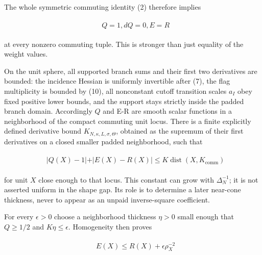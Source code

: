 The whole symmetric commuting identity (2) therefore implies

\begin{gather*}
\begin{aligned}
& Q=1, dQ=0, E=R
\end{aligned}\tag{15}
\end{gather*}

at every nonzero commuting tuple. This is stronger than just equality of
the weight values.

On the unit sphere, all supported branch sums and their first two
derivatives are bounded: the incidence Hessian is uniformly invertible
after (7), the flag multiplicity is bounded by (10), all nonconstant
cutoff transition scales \(a_{I}\) obey fixed positive lower bounds, and
the support stays strictly inside the padded branch domain. Accordingly
\(Q\) and E-R are smooth scalar functions in a neighborhood of the
compact commuting unit locus. There is a finite explicitly defined
derivative bound \(K_{N,\kappa ,L,\sigma ,\Theta}\), obtained as the
supremum of their first derivatives on a closed smaller padded
neighborhood, such that

\begin{gather*}
\begin{aligned}
& \vert Q(X)-1\vert +\vert E(X)-R(X)\vert  \le  K \operatorname{dist} (X,K_{\mathrm{comm}})
\end{aligned}\tag{16}
\end{gather*}

for unit \(X\) close enough to that locus. This constant can grow with
\(\Delta _{N}^{-1}\); it is not asserted uniform in the shape gap. Its
role is to determine a later near-cone thickness, never to appear as an
unpaid inverse-square coefficient.

For every \(\epsilon >0\) choose a neighborhood thickness \(\eta >0\)
small enough that \(Q\ge 1/2\) and \(K \eta \le \epsilon\). Homogeneity
then proves

\begin{gather*}
\begin{aligned}
& E(X) \le  R(X)+\epsilon  \rho _{X}^{-2}
\end{aligned}\tag{17}
\end{gather*}

